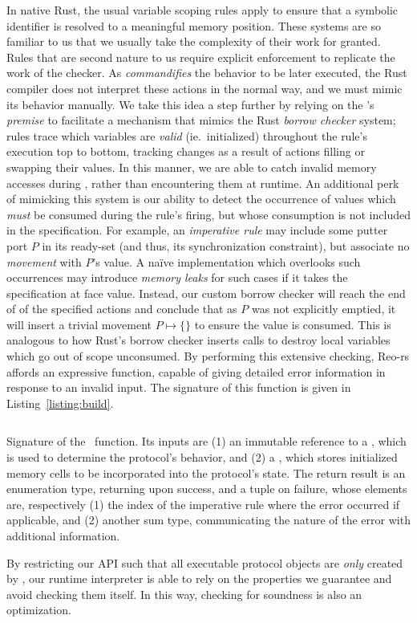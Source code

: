 In native Rust, the usual variable scoping rules apply to ensure that a symbolic identifier is resolved to a meaningful memory position. These systems are so familiar to us that we usually take the complexity of their work for granted. Rules that are second nature to us require explicit enforcement to replicate the work of the checker. As  \textit{commandifies} the behavior to be later executed, the Rust compiler does not interpret these actions in the normal way, and we must mimic its behavior manually. We take this idea a step further by relying on the 's \textit{premise} to facilitate a mechanism that mimics the Rust \textit{borrow checker} system; rules trace which variables are \textit{valid} (ie.\ initialized) throughout the rule's execution top to bottom, tracking changes as a result of actions filling or swapping their values. In this manner, we are able to catch invalid memory accesses during , rather than encountering them at runtime. An additional perk of mimicking this system is our ability to detect the occurrence of values which \textit{must} be consumed during the rule's firing, but whose consumption is not included in the specification. For example, an \textit{imperative rule} may include some putter port $P$ in its ready-set (and thus, its synchronization constraint), but associate no \textit{movement} with $P$'s value. A na\"ive implementation which overlooks such occurrences may introduce \textit{memory leaks} for such cases if it takes the specification at face value. Instead, our custom borrow checker will reach the end of of the specified actions and conclude that as $P$ was not explicitly emptied, it will insert a trivial movement $P\mapsto{} \{\}$ to ensure the value is consumed. This is analogous to how Rust's borrow checker inserts  calls to destroy local variables which go out of scope unconsumed. By performing this extensive checking, Reo-rs affords an expressive  function, capable of giving detailed error information in response to an invalid input. The signature of this function is given in Listing~\ref{listing:build}.


\begin{listing}[ht]
	\centering
	\inputminted[]{rust}{build.rs}
	\caption[TODO.]{Signature of the~ function. Its inputs are (1) an immutable reference to a , which is used to determine the protocol's behavior, and (2) a , which stores initialized memory cells to be incorporated into the protocol's state. The return result is an enumeration type, returning  upon success, and a tuple on failure, whose elements are, respectively (1) the index of the imperative rule where the error occurred if applicable, and (2) another sum type, communicating the nature of the error with additional information. }
	\label{listing:build}
\end{listing}

By restricting our API such that all executable protocol objects are \textit{only} created by , our runtime interpreter is able to rely on the properties we guarantee and avoid checking them itself. In this way, checking for soundness is also an optimization.